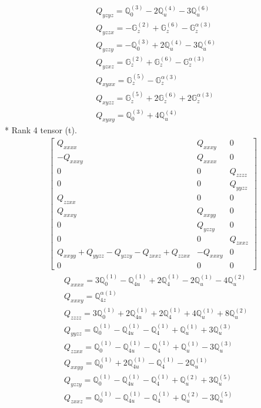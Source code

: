 \documentclass[fleqn,8pt,landscape]{jsarticle}
\begin{document}
\begin{align*}
& Q_{yzyz} = \mathbb{Q}_{0}^{(3)} - 2 \mathbb{Q}_{u}^{(4)} - 3 \mathbb{Q}_{u}^{(6)} \\
& Q_{yzzx} = - \mathbb{G}_{z}^{(2)} + \mathbb{G}_{z}^{(6)} - \mathbb{G}_{z}^{\alpha(3)} \\
& Q_{yzzy} = - \mathbb{Q}_{0}^{(3)} + 2 \mathbb{Q}_{u}^{(4)} - 3 \mathbb{Q}_{u}^{(6)} \\
& Q_{yzxz} = \mathbb{G}_{z}^{(2)} + \mathbb{G}_{z}^{(6)} - \mathbb{G}_{z}^{\alpha(3)} \\
& Q_{xyxx} = \mathbb{G}_{z}^{(5)} - \mathbb{G}_{z}^{\alpha(3)} \\
& Q_{xyzz} = \mathbb{G}_{z}^{(5)} + 2 \mathbb{G}_{z}^{(6)} + 2 \mathbb{G}_{z}^{\alpha(3)} \\
& Q_{xyxy} = \mathbb{Q}_{0}^{(3)} + 4 \mathbb{Q}_{u}^{(4)}
\end{align*}
* Rank 4 tensor (t).
\begin{align*}
\begin{bmatrix} Q_{xxxx} & Q_{xxxy} & 0 \\ - Q_{xxxy} & Q_{xxxx} & 0 \\ 0 & 0 & Q_{zzzz} \\ 0 & 0 & Q_{yyzz} \\ Q_{zzxx} & 0 & 0 \\ Q_{xxxy} & Q_{xxyy} & 0 \\ 0 & Q_{yzzy} & 0 \\ 0 & 0 & Q_{zxxz} \\ Q_{xxyy} + Q_{yyzz} - Q_{yzzy} - Q_{zxxz} + Q_{zzxx} & - Q_{xxxy} & 0 \\ 0 & 0 & 0 \end{bmatrix}
\end{align*}
\begin{align*}
& Q_{xxxx} = 3 \mathbb{Q}_{0}^{(1)} - \mathbb{Q}_{4u}^{(1)} + 2 \mathbb{Q}_{4}^{(1)} - 2 \mathbb{Q}_{u}^{(1)} - 4 \mathbb{Q}_{u}^{(2)} \\
& Q_{xxxy} = \mathbb{Q}_{4z}^{\alpha(1)} \\
& Q_{zzzz} = 3 \mathbb{Q}_{0}^{(1)} + 2 \mathbb{Q}_{4u}^{(1)} + 2 \mathbb{Q}_{4}^{(1)} + 4 \mathbb{Q}_{u}^{(1)} + 8 \mathbb{Q}_{u}^{(2)} \\
& Q_{yyzz} = \mathbb{Q}_{0}^{(1)} - \mathbb{Q}_{4u}^{(1)} - \mathbb{Q}_{4}^{(1)} + \mathbb{Q}_{u}^{(1)} + 3 \mathbb{Q}_{u}^{(3)} \\
& Q_{zzxx} = \mathbb{Q}_{0}^{(1)} - \mathbb{Q}_{4u}^{(1)} - \mathbb{Q}_{4}^{(1)} + \mathbb{Q}_{u}^{(1)} - 3 \mathbb{Q}_{u}^{(3)} \\
& Q_{xxyy} = \mathbb{Q}_{0}^{(1)} + 2 \mathbb{Q}_{4u}^{(1)} - \mathbb{Q}_{4}^{(1)} - 2 \mathbb{Q}_{u}^{(1)} \\
& Q_{yzzy} = \mathbb{Q}_{0}^{(1)} - \mathbb{Q}_{4u}^{(1)} - \mathbb{Q}_{4}^{(1)} + \mathbb{Q}_{u}^{(2)} + 3 \mathbb{Q}_{u}^{(5)} \\
& Q_{zxxz} = \mathbb{Q}_{0}^{(1)} - \mathbb{Q}_{4u}^{(1)} - \mathbb{Q}_{4}^{(1)} + \mathbb{Q}_{u}^{(2)} - 3 \mathbb{Q}_{u}^{(5)}
\end{align*}
\end{document}
